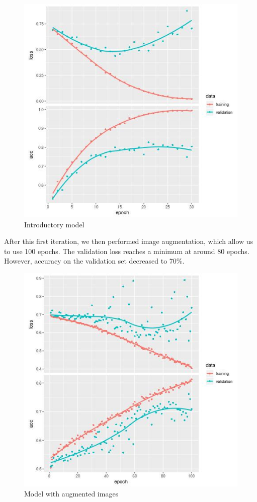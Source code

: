 \documentclass[]{book}
\begin{document}
\begin{figure}
\centering
\includegraphics{history-CNN-scratch_full.jpg}
\caption{Introductory model}
\end{figure}

\clearpage

After this first iteration, we then performed image augmentation, which allow us to use 100 epochs.
The validation loss reaches a minimum at around 80 epochs.
However, accuracy on the validation set decreased to 70\%.

\begin{figure}
\centering
\includegraphics{history-CNN-augmented-scratch.jpg}
\caption{Model with augmented images}
\end{figure}
\end{document}
